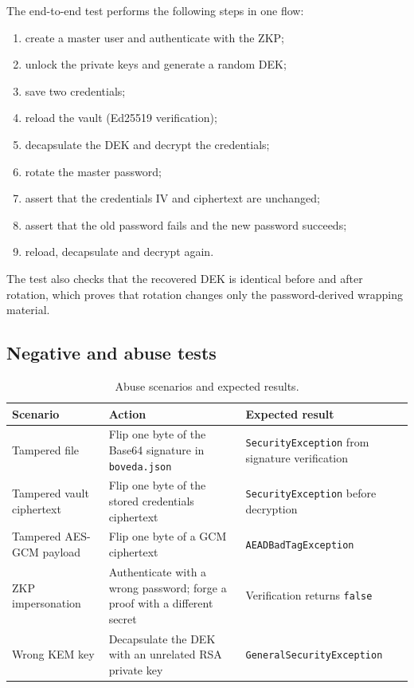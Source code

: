 \documentclass[11pt,a4paper]{article}
\newcommand{\code}[1]{\texttt{#1}}
\begin{document}
The end-to-end test performs the following steps in one flow:

\begin{enumerate}[leftmargin=*]
  \item create a master user and authenticate with the ZKP;
  \item unlock the private keys and generate a random DEK;
  \item save two credentials;
  \item reload the vault (Ed25519 verification);
  \item decapsulate the DEK and decrypt the credentials;
  \item rotate the master password;
  \item assert that the credentials IV and ciphertext are unchanged;
  \item assert that the old password fails and the new password succeeds;
  \item reload, decapsulate and decrypt again.
\end{enumerate}

The test also checks that the recovered DEK is identical before and after
rotation, which proves that rotation changes only the password-derived wrapping
material.

\subsection{Negative and abuse tests}

\begin{table}[htbp]
\centering
\small
\begin{tabular}{@{}p{4.3cm}p{5.0cm}p{5.0cm}@{}}
\toprule
\textbf{Scenario} & \textbf{Action} & \textbf{Expected result} \\
\midrule
Tampered file & Flip one byte of the Base64 signature in \code{boveda.json} & \code{SecurityException} from signature verification \\
Tampered vault ciphertext & Flip one byte of the stored credentials ciphertext & \code{SecurityException} before decryption \\
Tampered AES-GCM payload & Flip one byte of a GCM ciphertext & \code{AEADBadTagException} \\
ZKP impersonation & Authenticate with a wrong password; forge a proof with a different secret & Verification returns \code{false} \\
Wrong KEM key & Decapsulate the DEK with an unrelated RSA private key & \code{GeneralSecurityException} \\
\bottomrule
\end{tabular}
\caption{Abuse scenarios and expected results.}
\label{tab:abuse}
\end{table}
\end{document}
